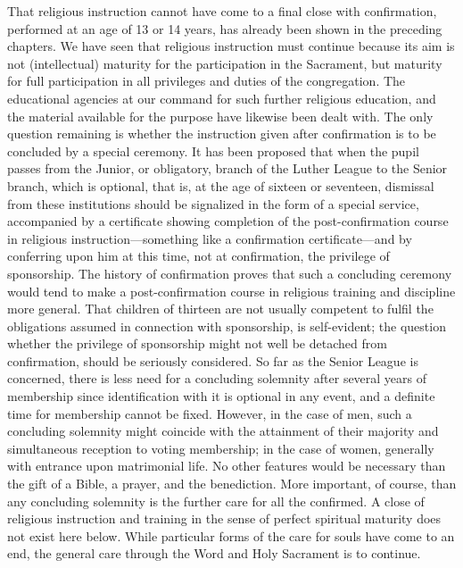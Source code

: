 That religious instruction cannot have come to a final close with confirmation, performed at an age of 13 or 14 years, has already been shown in the preceding chapters. We have seen that religious instruction must continue because its aim is not (intellectual) maturity for the participation in the Sacrament, but maturity for full participation in all privileges and duties of the congregation. The educational agencies at our command for such further religious education, and the material available for the purpose have likewise been dealt with. The only question remaining is whether the instruction given after confirmation is to be concluded by a special ceremony. It has been proposed that when the pupil passes from the Junior, or obligatory, branch of the Luther League to the Senior branch, which is optional, that is, at the age of sixteen or seventeen, dismissal from these institutions should be signalized in the form of a special service, accompanied by a certificate showing completion of the post-confirmation course in religious instruction—something like a confirmation certificate—and by conferring upon him at this time, not at confirmation, the privilege of sponsorship. The history of confirmation proves that such a concluding ceremony would tend to make a post-confirmation course in religious training and discipline more general. That children of thirteen are not usually competent to fulfil the obligations assumed in connection with sponsorship, is self-evident; the question whether the privilege of sponsorship might not well be detached from confirmation,
should be seriously considered. So far as the Senior League is concerned, there is less need for a concluding solemnity after several years of membership since identification with it is optional in any event, and a definite time for membership cannot be fixed. However, in the case of men, such a concluding solemnity might coincide with the attainment of their majority and simultaneous reception to voting membership; in the case of women, generally with entrance upon matrimonial life. No other features would be necessary than the gift of a Bible, a prayer, and the benediction. More important, of course, than any concluding solemnity is the further care for all the confirmed. A close of religious instruction and training in the sense of perfect spiritual maturity does not exist here below. While particular forms of the care for souls have come to an end, the general care through the Word and Holy Sacrament is to continue.
